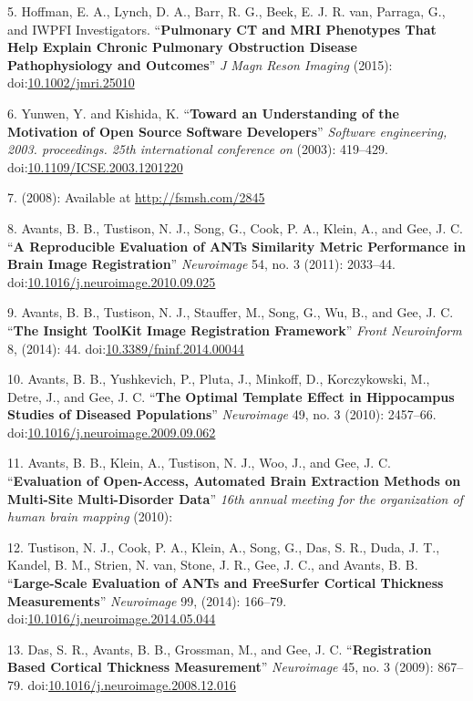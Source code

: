 \documentclass[11pt,]{article}
\begin{document}
5. Hoffman, E. A., Lynch, D. A., Barr, R. G., Beek, E. J. R. van,
Parraga, G., and IWPFI Investigators. ``\textbf{Pulmonary CT and MRI
Phenotypes That Help Explain Chronic Pulmonary Obstruction Disease
Pathophysiology and Outcomes}'' \emph{J Magn Reson Imaging} (2015):
doi:\href{http://dx.doi.org/10.1002/jmri.25010}{10.1002/jmri.25010}

6. Yunwen, Y. and Kishida, K. ``\textbf{Toward an Understanding of the
Motivation of Open Source Software Developers}'' \emph{Software
engineering, 2003. proceedings. 25th international conference on}
(2003): 419--429.
doi:\href{http://dx.doi.org/10.1109/ICSE.2003.1201220}{10.1109/ICSE.2003.1201220}

7. (2008): Available at \url{http://fsmsh.com/2845}

8. Avants, B. B., Tustison, N. J., Song, G., Cook, P. A., Klein, A., and
Gee, J. C. ``\textbf{A Reproducible Evaluation of ANTs Similarity Metric
Performance in Brain Image Registration}'' \emph{Neuroimage} 54, no. 3
(2011): 2033--44.
doi:\href{http://dx.doi.org/10.1016/j.neuroimage.2010.09.025}{10.1016/j.neuroimage.2010.09.025}

9. Avants, B. B., Tustison, N. J., Stauffer, M., Song, G., Wu, B., and
Gee, J. C. ``\textbf{The Insight ToolKit Image Registration Framework}''
\emph{Front Neuroinform} 8, (2014): 44.
doi:\href{http://dx.doi.org/10.3389/fninf.2014.00044}{10.3389/fninf.2014.00044}

10. Avants, B. B., Yushkevich, P., Pluta, J., Minkoff, D., Korczykowski,
M., Detre, J., and Gee, J. C. ``\textbf{The Optimal Template Effect in
Hippocampus Studies of Diseased Populations}'' \emph{Neuroimage} 49, no.
3 (2010): 2457--66.
doi:\href{http://dx.doi.org/10.1016/j.neuroimage.2009.09.062}{10.1016/j.neuroimage.2009.09.062}

11. Avants, B. B., Klein, A., Tustison, N. J., Woo, J., and Gee, J. C.
``\textbf{Evaluation of Open-Access, Automated Brain Extraction Methods
on Multi-Site Multi-Disorder Data}'' \emph{16th annual meeting for the
organization of human brain mapping} (2010):

12. Tustison, N. J., Cook, P. A., Klein, A., Song, G., Das, S. R., Duda,
J. T., Kandel, B. M., Strien, N. van, Stone, J. R., Gee, J. C., and
Avants, B. B. ``\textbf{Large-Scale Evaluation of ANTs and FreeSurfer
Cortical Thickness Measurements}'' \emph{Neuroimage} 99, (2014):
166--79.
doi:\href{http://dx.doi.org/10.1016/j.neuroimage.2014.05.044}{10.1016/j.neuroimage.2014.05.044}

13. Das, S. R., Avants, B. B., Grossman, M., and Gee, J. C.
``\textbf{Registration Based Cortical Thickness Measurement}''
\emph{Neuroimage} 45, no. 3 (2009): 867--79.
doi:\href{http://dx.doi.org/10.1016/j.neuroimage.2008.12.016}{10.1016/j.neuroimage.2008.12.016}
\end{document}
